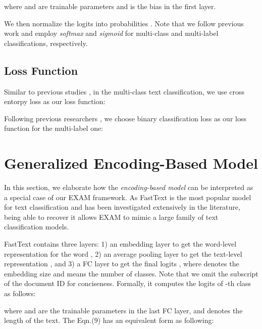 \documentclass[letterpaper]{article} \usepackage{aaai19}  \usepackage{times}  \usepackage{helvet}  \usepackage{courier}  \usepackage{url}  \usepackage{graphicx}
\begin{document}
where  and  are trainable parameters and  is the bias in the first layer.

We then normalize the logits  into probabilities . Note that we follow previous work \cite{fasttext} and employ \textit{softmax} and \textit{sigmoid} for multi-class and multi-label classifications, respectively.


\subsection{Loss Function}
Similar to previous studies \cite{vdcnn}, in the multi-class text classification, we use cross entorpy loss as our loss function:

Following previous researchers \cite{fasttext}, we choose binary classification loss as our loss function for the multi-label one:


\section{Generalized Encoding-Based Model}
In this section, we elaborate how the \textit{encoding-based model} can be interpreted as a special case of our EXAM framework. As FastText \cite{fasttext} is the most popular model for text classification and has been investigated extensively in the literature, being able to recover it allows EXAM to mimic a large family of text classification models.

FastText contains three layers: 1) an embedding layer to get the word-level representation  for the word , 2) an average pooling layer to get the text-level representation , and 3) a FC layer to get the final logits , where  denotes the embedding size and  means the number of classes. Note that we omit the subscript of the document ID for conciseness. Formally, it computes the logits  of -th class as follows:

where  and  are the trainable parameters in the last FC layer, and  denotes the length of the text. The Eqn.(9) has an equivalent form as following:
\end{document}

